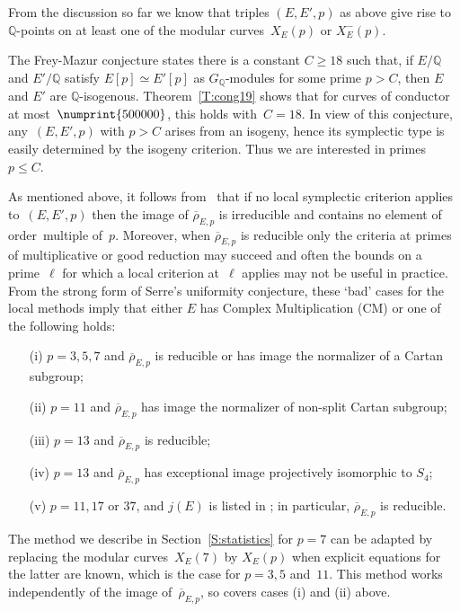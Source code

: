 \documentclass[12pt, reqno]{amsart}
\newcommand{\Q}{\mathbb{Q}}
\newcommand{\rhobar}{{\overline{\rho}}}
\numberwithin{equation}{section}
\theoremstyle{definition}
\theoremstyle{remark}
\begin{document}
From the discussion so far we know that triples $(E,E',p)$ as above give rise to $\Q$-points on at least one of the modular curves~$X_E(p)$ or $X_E^-(p)$. 

The Frey-Mazur conjecture states there is a constant $C \geq 18$ such
that, if $E/\Q$ and $E'/\Q$ satisfy $E[p] \simeq E'[p]$ as
$G_\Q$-modules for some prime $p > C$, then $E$ and $E'$ are
$\Q$-isogenous. Theorem~\ref{T:cong19} shows that for curves of
conductor at most~$\numprint{500000}$, this holds with~$C=18$. In view
of this conjecture, any~$(E,E',p)$ with $p > C$ arises from an
isogeny, hence its symplectic type is easily determined by the isogeny
criterion. Thus we are interested in primes $p \leq C$.


As mentioned above, it follows from~\cite{FKSym} that if no local
symplectic criterion applies to~$(E,E',p)$ then the image of
$\rhobar_{E,p}$ is irreducible and contains no element of
order~multiple of~$p$. Moreover, when $\rhobar_{E,p}$ is reducible
only the criteria at primes of multiplicative or good reduction may
succeed and often the bounds on a prime~$\ell$ for which a local
criterion at~$\ell$ applies may not be useful in practice.  From the
strong form of Serre's uniformity conjecture, these `bad' cases for
the local methods imply that either $E$ has Complex Multiplication
(CM) or one of the following holds:
\begin{itemize}
 \item[(i)] $p=3,5,7$ and $\rhobar_{E,p}$ is reducible or has image the normalizer of a Cartan subgroup;
 \item[(ii)] $p=11$ and $\rhobar_{E,p}$ has image the normalizer of non-split Cartan subgroup;
 \item[(iii)] $p=13$ and $\rhobar_{E,p}$ is reducible; 
 \item[(iv)] $p=13$ and $\rhobar_{E,p}$ has exceptional image projectively isomorphic to $S_4$;
 \item[(v)] $p=11,17$ or $37$, and $j(E)$ is listed
 in \cite[Table~2.1]{DahmenPhD}; in particular, $\rhobar_{E,p}$ is reducible.
\end{itemize}
The method we describe in Section~\ref{S:statistics} for $p=7$ can be
adapted by replacing the modular curves~$X_E(7)$ by $X_E(p)$ when
explicit equations for the latter are known, which is the case for
$p=3,5$ and~$11$. This method works independently of the image
of~$\rhobar_{E,p}$, so covers cases (i) and (ii) above.
\end{document}
